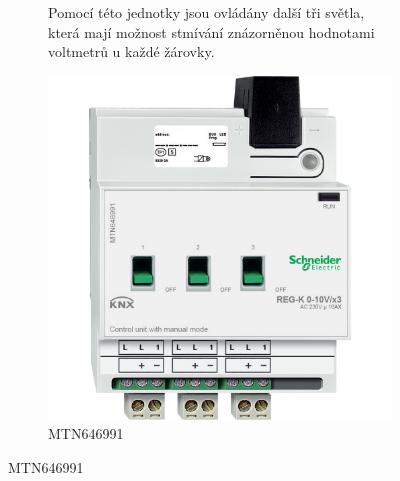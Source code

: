 \documentclass[12pt, a4paper,
twoside,        %
openright
]{report}
\begin{document}
\begin{figure}[h]
\begin{subfigure}{0.9\textwidth}
	\noindent Pomocí této jednotky jsou ovládány další tři světla, která mají možnost stmívání znázorněnou hodnotami voltmetrů u každé žárovky.

		\centering
		\includegraphics[scale=0.09]{image/MTN646991.jpg}
		\caption{MTN646991}
		\label{image:4}
\end{subfigure}
\end{figure}
\end{document}
